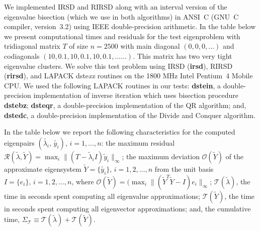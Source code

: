 \documentclass{report}
\begin{document}
We implemented IRSD and RIRSD along with an interval version of
the eigenvalue bisection (which we use in both algorithms)
in ANSI~C (GNU~C compiler, version~3.2) using IEEE
double-precision arithmetic. In the table below we present
computational times and residuals for the test eigenproblem with
tridiagonal matrix $T$ of size $n=2500$ with main diagonal $(0,
0, 0, \ldots)$ and codiagonals $(10, 0.1, 10, 0.1, 10, 0.1,
...\ldots)$. This matrix has two very tight eigenvalue clusters.
We solve this test problem using IRSD (\textbf{irsd}), RIRSD (\textbf{rirsd}),
and LAPACK dste\emph{xx} routines on the 1800 MHz
Intel\textregistered{} Pentium~4 Mobile\textregistered{} CPU\@.
We used the following LAPACK routines in our tests:
\textbf{dstein}, a double-precision implementation of inverse iteration which
uses bisection procedure \textbf{dstebz};
\textbf{dsteqr}, a double-precision implementation of the QR algorithm; and,
\textbf{dstedc}, a double-precision implementation of the Divide and Conquer algorithm.

In the table below we report the following characteristics for
the computed eigenpairs
$(\tilde{\lambda_i},\,\tilde{y_i}),\,i=1,\ldots, n$: the maximum
residual $\mathcal{R}(\tilde{\lambda}, \tilde{Y}) = \max_i \| (T
- \tilde{\lambda}_i I) \tilde{y}_i \|_\infty$; the maximum
deviation $\mathcal{O}(\tilde{Y})$ of the approximate eigensystem
$\tilde{Y} = \{\tilde{y_i}\},\, i = 1, 2, \ldots, n$ from the unit basis
$I = \{e_i\},\, i = 1, 2,\ldots, n$, where
$\mathcal{O}(\tilde{Y})=(\max_i \|(\tilde{Y}^T \tilde{Y} - I)
e_i\|_\infty$; $\mathcal{T}( \tilde{\lambda})$, the time in seconds spent
computing all eigenvalue
approximations; $\mathcal{T}( \tilde{Y})$, the time in seconds
spent computing all eigenvector approximations; and, the
cumulative time, $\Sigma_{\mathcal{T}} \equiv
\mathcal{T}(\tilde{\lambda}) + \mathcal{T}( \tilde{Y})$.

\begin{table}[hbtp]
\centering
{}
\label{tbl:TestNew}
\end{table}
\end{document}
